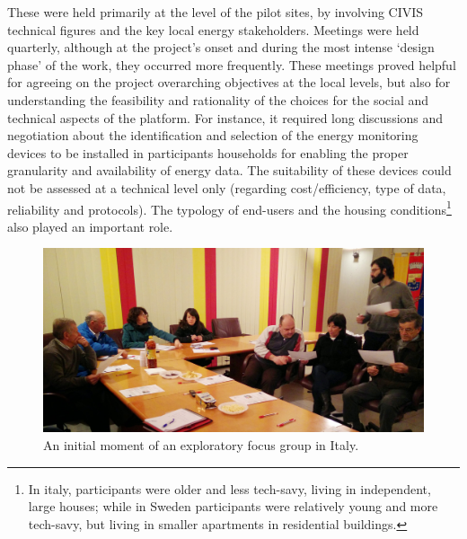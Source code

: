 These were held primarily at the level of the pilot sites, by involving CIVIS technical figures and the
key local energy stakeholders. Meetings were held quarterly, although at the project's onset and during
the most intense `design phase' of the work, they occurred more frequently.
% 
These meetings proved helpful for agreeing on the project overarching objectives at the local levels, but also
for understanding the feasibility and rationality of the choices for the social and technical aspects of the platform.
For instance, it required long discussions and negotiation about the identification and selection of the energy monitoring devices to be installed in
participants households for enabling the proper granularity and availability of energy data. 
The suitability of these devices could not be assessed at a technical level only (regarding cost/efficiency, type of data,
reliability and protocols).
The typology of end-users and the housing conditions\footnote{In italy, participants were older and less tech-savy, living in independent, large houses; while in Sweden participants were relatively young and more tech-savy, but living in smaller apartments in residential buildings.}
also played an important role. 

%
%


%
\begin{figure}[h!]
	\sidecaption[t]
	\includegraphics[width=.5\linewidth]{img/FocusGroup_TN.jpg}
	\caption{An initial moment of an exploratory focus group in Italy.}
	\label{fig:focusgroups}
\end{figure}


